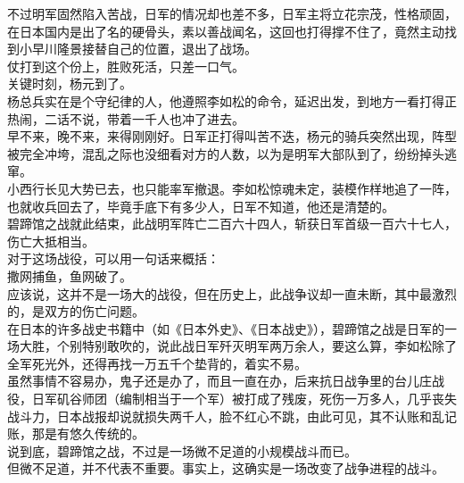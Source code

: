 \begin{multicols}{\theparacolNo}
不过明军固然陷入苦战，日军的情况却也差不多，日军主将立花宗茂，性格顽固，在日本国内是出了名的硬骨头，素以善战闻名，这回也打得撑不住了，竟然主动找到小早川隆景接替自己的位置，退出了战场。\\

仗打到这个份上，胜败死活，只差一口气。\\

关键时刻，杨元到了。\\

杨总兵实在是个守纪律的人，他遵照李如松的命令，延迟出发，到地方一看打得正热闹，二话不说，带着一千人也冲了进去。\\

早不来，晚不来，来得刚刚好。日军正打得叫苦不迭，杨元的骑兵突然出现，阵型被完全冲垮，混乱之际也没细看对方的人数，以为是明军大部队到了，纷纷掉头逃窜。\\

小西行长见大势已去，也只能率军撤退。李如松惊魂未定，装模作样地追了一阵，也就收兵回去了，毕竟手底下有多少人，日军不知道，他还是清楚的。\\

碧蹄馆之战就此结束，此战明军阵亡二百六十四人，斩获日军首级一百六十七人，伤亡大抵相当。\\

对于这场战役，可以用一句话来概括：\\

撒网捕鱼，鱼网破了。\\

应该说，这并不是一场大的战役，但在历史上，此战争议却一直未断，其中最激烈的，是双方的伤亡问题。\\

在日本的许多战史书籍中（如《日本外史》、《日本战史》），碧蹄馆之战是日军的一场大胜，个别特别敢吹的，说此战日军歼灭明军两万余人，要这么算，李如松除了全军死光外，还得再找一万五千个垫背的，着实不易。\\

虽然事情不容易办，鬼子还是办了，而且一直在办，后来抗日战争里的台儿庄战役，日军矶谷师团（编制相当于一个军）被打成了残废，死伤一万多人，几乎丧失战斗力，日本战报却说就损失两千人，脸不红心不跳，由此可见，其不认账和乱记账，那是有悠久传统的。\\

说到底，碧蹄馆之战，不过是一场微不足道的小规模战斗而已。\\

但微不足道，并不代表不重要。事实上，这确实是一场改变了战争进程的战斗。\\


\end{multicols}
